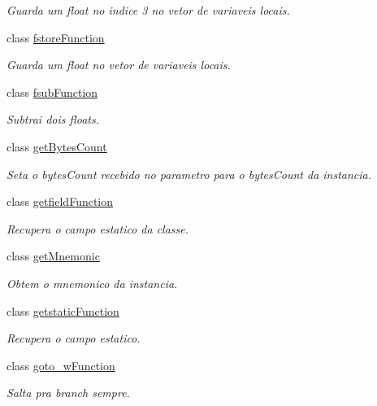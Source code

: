 \begin{DoxyCompactItemize}
\begin{DoxyCompactList}\small\item\em Guarda um float no indice 3 no vetor de variaveis locais. \end{DoxyCompactList}\item 
class \hyperlink{classInstruction_1_1fstoreFunction}{fstore\+Function}
\begin{DoxyCompactList}\small\item\em Guarda um float no vetor de variaveis locais. \end{DoxyCompactList}\item 
class \hyperlink{classInstruction_1_1fsubFunction}{fsub\+Function}
\begin{DoxyCompactList}\small\item\em Subtrai dois floats. \end{DoxyCompactList}\item 
class \hyperlink{classInstruction_1_1getBytesCount}{get\+Bytes\+Count}
\begin{DoxyCompactList}\small\item\em Seta o bytes\+Count recebido no parametro para o bytes\+Count da instancia. \end{DoxyCompactList}\item 
class \hyperlink{classInstruction_1_1getfieldFunction}{getfield\+Function}
\begin{DoxyCompactList}\small\item\em Recupera o campo estatico da classe. \end{DoxyCompactList}\item 
class \hyperlink{classInstruction_1_1getMnemonic}{get\+Mnemonic}
\begin{DoxyCompactList}\small\item\em Obtem o mnemonico da instancia. \end{DoxyCompactList}\item 
class \hyperlink{classInstruction_1_1getstaticFunction}{getstatic\+Function}
\begin{DoxyCompactList}\small\item\em Recupera o campo estatico. \end{DoxyCompactList}\item 
class \hyperlink{classInstruction_1_1goto__wFunction}{goto\+\_\+w\+Function}
\begin{DoxyCompactList}\small\item\em Salta pra branch sempre. \end{DoxyCompactList}\item 

\end{DoxyCompactItemize}
